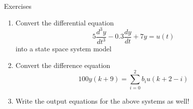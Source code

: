 \begin{frame}
Exercises
 \begin{enumerate}
 \item Convert the differential equation
\[5\frac{d^3y}{dt^3}-0.3\frac{dy}{dt}+7y=u(t)\]
into a state space system model
 \item Convert the difference equation
\[100y(k+9) = \sum_{i=0}^2b_iu(k+2-i)\]
 \item Write the output equations for the above systems as well!
\end{enumerate}
\end{frame}
